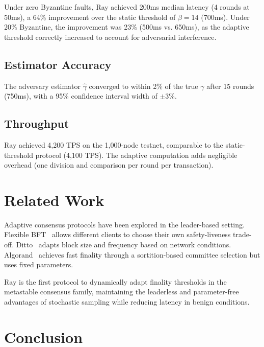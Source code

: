 \documentclass[11pt,a4paper]{article}
\begin{document}
Under zero Byzantine faults, Ray achieved 200ms median latency (4 rounds at 50ms),
a 64\% improvement over the static threshold of $\beta = 14$ (700ms). Under 20\%
Byzantine, the improvement was 23\% (500ms vs. 650ms), as the adaptive threshold
correctly increased to account for adversarial interference.

\subsection{Estimator Accuracy}

The adversary estimator $\hat{\gamma}$ converged to within 2\% of the true $\gamma$
after 15 rounds (750ms), with a 95\% confidence interval width of $\pm 3\%$.

\subsection{Throughput}

Ray achieved 4,200 TPS on the 1,000-node testnet, comparable to the static-threshold
protocol (4,100 TPS). The adaptive computation adds negligible overhead (one division
and comparison per round per transaction).

\section{Related Work}
\label{sec:related}

Adaptive consensus protocols have been explored in the leader-based setting.
Flexible BFT~\cite{malkhi2019flexible} allows different clients to choose their own
safety-liveness trade-off. Ditto~\cite{gelashvili2022ditto} adapts block size and
frequency based on network conditions. Algorand~\cite{gilad2017algorand} achieves
fast finality through a sortition-based committee selection but uses fixed parameters.

Ray is the first protocol to dynamically adapt finality thresholds in the metastable
consensus family, maintaining the leaderless and parameter-free advantages of
stochastic sampling while reducing latency in benign conditions.

\section{Conclusion}
\label{sec:conclusion}
\end{document}
